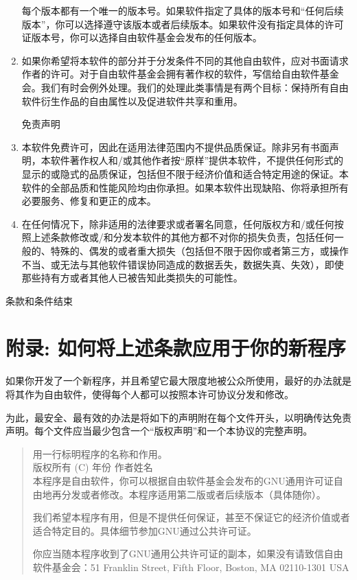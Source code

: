 \documentclass[11pt]{article}
\begin{document}
\begin{enumerate}
每个版本都有一个唯一的版本号。如果软件指定了具体的版本号和“任何后续版本”，你可以选择遵守该版本或者后续版本。如果软件没有指定具体的许可证版本号，你可以选择自由软件基金会发布的任何版本。

\item
如果你希望将本软件的部分并于分发条件不同的其他自由软件，应对书面请求作者的许可。对于自由软件基金会拥有著作权的软件，写信给自由软件基金会。我们有时会例外处理。我们的处理此类事情是有两个目标：保持所有自由软件衍生作品的自由属性以及促进软件共享和重用。

\begin{center}
{\Large\sc
免责声明
}
\end{center}

\item
{\sc 本软件免费许可，因此在适用法律范围内不提供品质保证。除非另有书面声明，本软件著作权人和/或其他作者按“原样”提供本软件，不提供任何形式的显示的或隐式的品质保证，包括但不限于经济价值和适合特定用途的保证。本软件的全部品质和性能风险均由你承担。如果本软件出现缺陷、你将承担所有必要服务、修复和更正的成本。}

\item
{\sc 在任何情况下，除非适用的法律要求或者署名同意，任何版权方和/或任何按照上述条款修改或/和分发本软件的其他方都不对你的损失负责，包括任何一般的、特殊的、偶发的或者重大损失（包括但不限于因你或者第三方，或操作不当、或无法与其他软件错误协同造成的数据丢失，数据失真、失效），即使那些持有方或者其他人已被告知此类损失的可能性。}

\end{enumerate}


\begin{center}
{\Large\sc 条款和条件结束}
\end{center}


\pagebreak[2]

\section*{附录: 如何将上述条款应用于你的新程序}

如果你开发了一个新程序，并且希望它最大限度地被公众所使用，最好的办法就是将其作为自由软件，使得每个人都可以按照本许可协议分发和修改。

为此，最安全、最有效的办法是将如下的声明附在每个文件开头，以明确传达免责声明。每个文件应当最少包含一个“版权声明”和一个本协议的完整声明。

\begin{quote}
用一行标明程序的名称和作用。 \\
版权所有 (C) 年份  作者姓名 \\

本程序是自由软件，你可以根据自由软件基金会发布的GNU通用许可证自由地再分发或者修改。本程序适用第二版或者后续版本（具体随你）。

我们希望本程序有用，但是不提供任何保证，甚至不保证它的经济价值或者适合特定目的。具体细节参加GNU通过公共许可证。

你应当随本程序收到了GNU通用公共许可证的副本，如果没有请致信自由软件基金会：51 Franklin Street, Fifth Floor, Boston, MA 02110-1301 USA
\end{quote}
\end{document}
